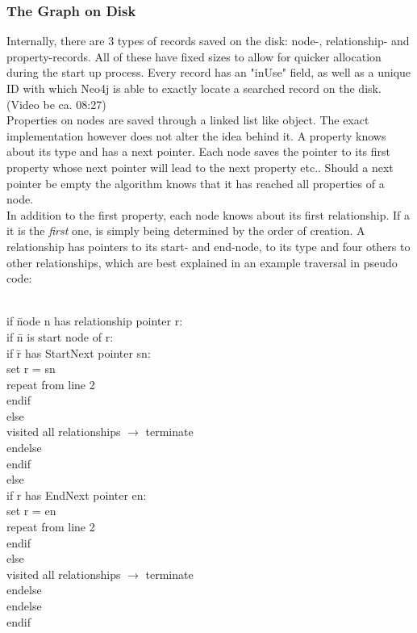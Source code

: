 \subsubsection{The Graph on Disk}
Internally, there are 3 types of records saved on the disk: node-, relationship- and property-records. All of these have fixed sizes to allow for quicker allocation during the start up process. Every record has an "inUse" field, as well as a unique ID with which Neo4j is able to exactly locate a searched record on the disk. (Video be ca. 08:27) \\
Properties on nodes are saved through a linked list like object. The exact implementation however does not alter the idea behind it. A property knows about its type and has a next pointer. Each node saves the pointer to its first property whose next pointer will lead to the next property etc.. Should a next pointer be empty the algorithm knows that it has reached all properties of a node. \\
In addition to the first property, each node knows about its first relationship. If a it is the \emph{first} one, is simply being determined by the order of creation. A relationship has pointers to its start- and end-node, to its type and four others to other relationships, which are best explained in an example traversal in pseudo code:
\begin{exmp}
\label{ex233}
\begin{tabbing}
\\
if \=node n has relationship pointer r: \\
\> if \=n is start node of r: \\
\> \> if \=r has StartNext pointer sn: \\
\> \> \> set r = sn \\
\> \> \> repeat from line 2 \\
\> \> endif \\
\> \> else  \\
\> \> \> visited all relationships $ \rightarrow $ terminate \\
\> \> endelse \\
\> endif \\
\> else \\
\> \> if r has EndNext pointer en: \\
\> \> \> set r = en \\
\> \> \>  repeat from line 2 \\
\> \> endif \\
\> \> else \\
\> \> \> visited all relationships $ \rightarrow $ terminate \\
\> \> endelse \\
\> endelse \\
endif
\end{tabbing}
\end{exmp}

